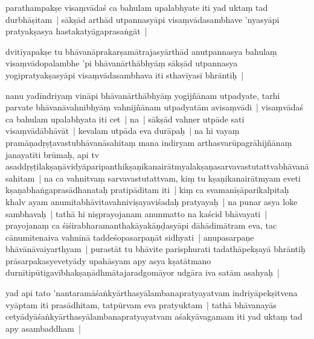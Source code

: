 \documentclass[article,12pt,a4paper]{memoir}%
\newcounter{parCount}
\begin{document}
	  \pstart \leavevmode%
	\label{thakur75-19.10}parathampakṣe visaṃvādaś ca bahulam upalabhyate iti yad uktaṃ tad durbhāṣitam | sākṣād arthād utpannasyāpi visaṃvādasambhave 'nyasyāpi pratyakṣasya hastakatyāgaprasaṅgāt | 
	{}
	\pend%
      

	  \pstart \leavevmode%
	\label{thakur75-19.12}dvitīyapakṣe tu bhāvanāprakarṣamātrajasyārthād anutpannasya bahulaṃ visaṃvādopalambhe 'pi bhāvanārthābhyāṃ sākṣād utpannasya yogipratyakṣasyāpi visaṃvādasambhava iti sthavīyasī bhrāntiḥ | 
	{}
	\pend%
      

	  \pstart \leavevmode%
	\label{thakur75-19.15}nanu yadīndriyaṃ vināpi bhāvanārthābhyāṃ yogijñānam utpadyate, tarhi parvate bhāvanāvahnibhyāṃ vahnijñānam utpadyatām avisaṃvādi | visaṃvādaś ca bahulam upalabhyata iti cet | na | sākṣād vahner utpāde sati visaṃvādābhāvāt | kevalam utpāda eva durāpaḥ | na hi vayaṃ pramāṇadṛṣṭavastubhāvanāsahitaṃ mana indiryam arthasvarūpagrāhijñānaṃ janayatīti brūmaḥ, api tv asaddṛṣṭilakṣaṇāvidyāparipanthikṣaṇikanairātmyalakṣaṇasarvavastutattvabhāvanāsahitam | na ca vahnitvaṃ sarvavastutattvam, kiṃ tu kṣaṇikanairātmyam eveti kṣaṇabhaṅgaprasādhanataḥ pratipāditam iti | kiṃ ca svamanīṣāparikalpitaḥ khalv ayam anumitabhāvitavahniviṣayaviśadaḥ pratyayaḥ | na punar asya loke sambhavaḥ | tathā hi niṣprayojanam anunmatto na kaścid bhāvayati | prayojanaṃ ca śiśirabharamanthakāyakāṇḍasyāpi dāhādimātram eva, tac cānumitenaiva vahninā taddeśopasarpaṇāt sidhyati | anupasarpaṇe bhāvānāvaiyarthyam | purastāt tu bhāvite parisphurati tadathāpekṣayā bhrāntiḥ prāsarpakasyevetyādy upahāsyam apy asya kṣatātmano durnītipūtigavībhakṣaṇādhmātajaradgomāyor udgāra iva satām asahyaḥ | 
	{}
	\pend%
      

	  \pstart \leavevmode%
	\label{thakur75-19.28}yad api tato 'nantaramāśaṅkyārthasyālambanapratyayatvam indriyāpekṣitvena vyāptam iti prasādhitam, tatpūrvam eva pratyuktam | tathā bhāvanayās cetyādyāśaṅkyārthasyālambanapratyayatvam aśakyāvagamam iti yad uktaṃ tad apy asambaddham | 
	{}
	\pend%
      
\end{document}
